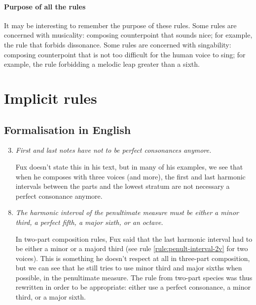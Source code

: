 \paragraph{Purpose of all the rules}
It may be interesting to remember the purpose of these rules. Some rules are concerned with musicality: composing counterpoint that sounds nice; for example, the rule that forbids dissonance. Some rules are concerned with singability: composing counterpoint that is not too difficult for the human voice to sing; for example, the rule forbidding a melodic leap greater than a sixth.

\section{Implicit rules}
\subsection{Formalisation in English} \label{sec:generalenglish}
\begin{enumerate}[wide, label=\bfseries 1.H2 and 1.H\arabic*]
    \setcounter{enumi}{2} %
    \item \greendots \textit{First and last notes have not to be perfect consonances anymore.} \label{rule:last-chord-not-perfect-anymore}    

    Fux doesn't state this in his text, but in many of his examples, we see that when he composes with three voices (and more), the first and last harmonic intervals between the parts and the lowest stratum are not necessary a perfect consonance anymore.
\end{enumerate}

\begin{enumerate}[wide, label=\bfseries 1.H7 and 1.H\arabic*]
    \setcounter{enumi}{7} %
    \item \greendots \textit{The harmonic interval of the penultimate measure must be either a minor
    third, a perfect fifth, a major sixth, or an octave.} \label{rule:penult-interval-3-voices}
    
    In two-part composition rules, Fux said that the last harmonic interval had to be either a minor or a majord third (see rule \ref{rule:penult-interval-2v} for two voices). This is something he doesn't respect at all in three-part composition, but we can see that he still tries to use minor third and major sixths when possible, in the penultimate measure. The rule from two-part species was thus rewritten in order to be appropriate: either use a perfect consonance, a minor third, or a major sixth.
\end{enumerate}


